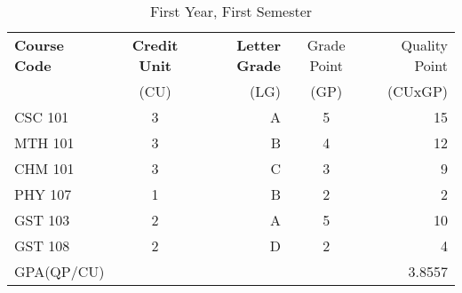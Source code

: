 \documentclass{article}
\begin{document}
	\begin{table}[h!]
		\begin{center}
			\caption{First Year, First Semester}
			\label{tab:table1}
			\begin{tabular}{l|c|r|c|r}
				\cellcolor{purple!25}\textbf{Course Code} & \cellcolor{purple!25}\textbf{Credit Unit} & \cellcolor{purple!25}\textbf{Letter Grade} & \cellcolor{purple!25}Grade Point & \cellcolor{purple!25}Quality Point\\
				
				\cellcolor{blue!25} &\cellcolor{blue!25} (CU) &\cellcolor{blue!25} (LG) & \cellcolor{blue!25} (GP) & \cellcolor{blue!25} (CUxGP)\\
				
				 \hline
				 \cellcolor{blue!20}CSC 101 & 3 & \cellcolor{green!25}A & 5 & 15\\
				 \cellcolor{blue!25}MTH 101 & 3 & \cellcolor{blue!25}B & 4 & 12\\
				 \cellcolor{blue!20}CHM 101 & 3 & \cellcolor{yellow!25}C & 3 & 9\\
				 \cellcolor{blue!25}PHY 107 & 1 & \cellcolor{blue!25}B & 2 & 2\\
				 \cellcolor{blue!20}GST 103 & 2 & \cellcolor{green!25}A & 5 & 10\\
				 \cellcolor{blue!25}GST 108 & 2 & \cellcolor{orange!25}D & 2 & 4\\
				 
				 \hline
				 \cellcolor{yellow!30}GPA(QP/CU) & \cellcolor{yellow!30} & \cellcolor{yellow!30} & \cellcolor{yellow!30} &\cellcolor{yellow!30} 3.8557	
			\end{tabular}
		\end{center}
	\end{table}
\end{document}
